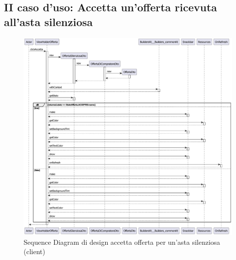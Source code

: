         \clearpage

        \subsection{II caso d'uso: Accetta un'offerta ricevuta all'asta silenziosa}
            \begin{figure}[htbp!]
                \centering
                    \includegraphics[width=1\linewidth]{Immagini/Diagrammi/Sequence Diagram/Design/Client Sequence Design/ClientSequenceAccettaOffertaDesign.pdf}
                \caption{Sequence Diagram di design accetta offerta per un'asta silenziosa (client)}
                \label{fig:Sequence Diagram di design accetta offerta per un'asta silenziosa (client)}
            \end{figure}

